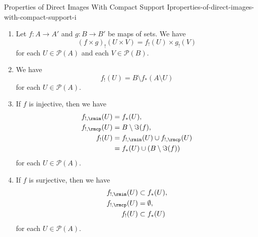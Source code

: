 \begin{proposition}{Properties of Direct Images With Compact Support I}{properties-of-direct-images-with-compact-support-i}
\begin{enumerate}
\[            \]%
            for each $U\in\mathcal{P}(A)$ and each $V\in\mathcal{P}(B)$.
        \item\label{properties-of-direct-images-with-compact-support-i-interaction-with-products}Let $f\colon A\to A'$ and $g\colon B\to B'$ be maps of sets. We have
            \[
                (f\times g)_{!}(U\times V)%
                =%
                f_{!}(U)\times g_{!}(V)%
            \]%
            for each $U\in\mathcal{P}(A)$ and each $V\in\mathcal{P}(B)$.
        \item\label{properties-of-direct-images-with-compact-support-i-relation-to-direct-images}We have
            \[
                f_{!}(U)%
                =%
                B\setminus f_{*}(A\setminus U)
            \]%
            for each $U\in\mathcal{P}(A)$.
        \item\label{properties-of-direct-images-with-compact-support-i-interaction-with-injections}If $f$ is injective, then we have
            \begin{align*}
                f_{!,\rmim}(U) &= f_{*}(U),\\
                f_{!,\rmcp}(U) &= B\setminus\Im(f),\\
                f_{!}(U)       &= f_{!,\rmim}(U)\cup f_{!,\rmcp}(U)\\
                               &= f_{*}(U)\cup(B\setminus\Im(f))
            \end{align*}
            for each $U\in\mathcal{P}(A)$.
        \item\label{properties-of-direct-images-with-compact-support-i-interaction-with-surjections}If $f$ is surjective, then we have
            \begin{align*}
                f_{!,\rmim}(U) &\subset  f_{*}(U),\\
                f_{!,\rmcp}(U) &=       \emptyset,\\
                f_{!}(U)       &\subset f_{*}(U)
            \end{align*}
            for each $U\in\mathcal{P}(A)$.
    \end{enumerate}
\end{proposition}
